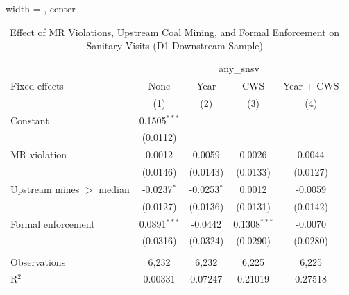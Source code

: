 
\begin{table}[htbp]
   
   \caption{\label{tab:sanitary_visit_mr_upstream_mines_ols} Effect of MR Violations, Upstream Coal Mining, and Formal Enforcement on Sanitary Visits (D1 Downstream Sample)}
   \bigskip
   
   \centering
   
   \begin{adjustbox}{width = \textwidth, center}
      
      
      \begin{tabular}{lcccc}
         \toprule
         
          & \multicolumn{4}{c}{any\_snsv}\\
         
         Fixed effects             & None           & Year          & CWS            & Year + CWS \\   
         
                                   & (1)            & (2)           & (3)            & (4)\\  
         
         \midrule 
         Constant                  & 0.1505$^{***}$ &               &                &   \\   
                                   & (0.0112)       &               &                &   \\   
         MR violation              & 0.0012         & 0.0059        & 0.0026         & 0.0044\\   
                                   & (0.0146)       & (0.0143)      & (0.0133)       & (0.0127)\\   
         Upstream mines $>$ median & -0.0237$^{*}$  & -0.0253$^{*}$ & 0.0012         & -0.0059\\   
                                   & (0.0127)       & (0.0136)      & (0.0131)       & (0.0142)\\   
         Formal enforcement        & 0.0891$^{***}$ & -0.0442       & 0.1308$^{***}$ & -0.0070\\   
                                   & (0.0316)       & (0.0324)      & (0.0290)       & (0.0280)\\   
         
          \\
         
         Observations              & 6,232          & 6,232         & 6,225          & 6,225\\  
         R$^2$                     & 0.00331        & 0.07247       & 0.21019        & 0.27518\\  
         

\end{tabular}
\end{adjustbox}
\end{table}
